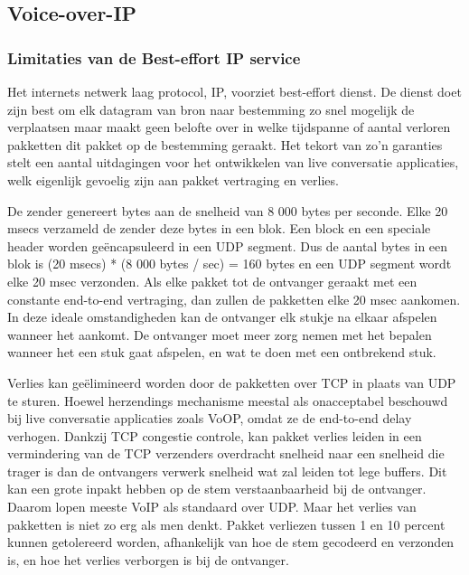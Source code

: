 \subsection{Voice-over-IP}

\subsubsection{Limitaties van de Best-effort IP service}

Het internets netwerk laag protocol, IP, voorziet best-effort dienst. De dienst doet zijn best om elk datagram van bron naar bestemming zo snel mogelijk de verplaatsen maar maakt geen belofte over in welke tijdspanne of aantal verloren pakketten dit pakket op de bestemming geraakt. Het tekort van zo’n garanties stelt een aantal uitdagingen voor het ontwikkelen van live conversatie applicaties, welk eigenlijk gevoelig zijn aan pakket vertraging en verlies.

De zender genereert bytes aan de snelheid van 8 000 bytes per seconde. Elke 20 msecs verzameld de zender deze bytes in een blok. Een block en een speciale header worden geëncapsuleerd in een UDP segment. Dus de aantal bytes in een blok is (20 msecs) * (8 000 bytes / sec) = 160 bytes en een UDP segment wordt elke 20 msec verzonden.
Als elke pakket tot de ontvanger geraakt met een constante end-to-end vertraging, dan zullen de pakketten elke 20 msec aankomen. In deze ideale omstandigheden kan de ontvanger elk stukje na elkaar afspelen wanneer het aankomt.
De ontvanger moet meer zorg nemen met het bepalen wanneer het een stuk gaat afspelen, en wat te doen met een ontbrekend stuk.


Verlies kan geëlimineerd worden door de pakketten over TCP in plaats van UDP te sturen. Hoewel herzendings mechanisme meestal als onacceptabel beschouwd bij live conversatie applicaties zoals VoOP, omdat ze de end-to-end delay verhogen. Dankzij TCP congestie controle, kan pakket verlies leiden in een vermindering van de TCP verzenders overdracht snelheid naar een snelheid die trager is dan de ontvangers verwerk snelheid wat zal leiden tot lege buffers. Dit kan een grote inpakt hebben op de stem verstaanbaarheid bij de ontvanger. Daarom lopen meeste VoIP als standaard over UDP.
Maar het verlies van pakketten is niet zo erg als men denkt. Pakket verliezen tussen 1 en 10 percent kunnen getolereerd worden, afhankelijk van hoe de stem gecodeerd en verzonden is, en hoe het verlies verborgen is bij de ontvanger.

